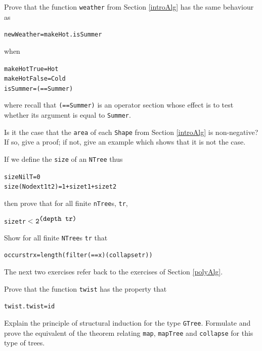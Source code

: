 \begin{exercises}

\item
Prove that the function \texttt{weather} from Section \ref{introAlg} has the same
behaviour as  
\begin{alltt}
newWeather = makeHot . isSummer
\end{alltt}
when
\begin{alltt}
makeHot True  = Hot
makeHot False = Cold
isSummer = (==Summer)
\end{alltt}
where recall that \texttt{(==Summer)} is an operator section whose effect is to
test whether its argument is equal to \texttt{Summer}.

\item
Is it the case that the \texttt{area} of each \texttt{Shape} from Section
\ref{introAlg} is non-negative? If so, give a proof; if not, give an example
which shows that it is not the case.

\item
If we define the \texttt{size} of an \texttt{NTree} thus
\begin{alltt}
size NilT           = 0
size (Node x t1 t2) = 1 + size t1 + size t2
\end{alltt}
then prove that for all finite \texttt{nTree}s, \texttt{tr},
\begin{alltt}
size tr \(<\) \(\mbox{\texttt{2}}^{\mbox{\texttt{(depth tr)}}}\)
\end{alltt}

\item
Show for all finite \texttt{NTree}s \texttt{tr} that
\begin{alltt}
occurs tr x = length (filter (==x) (collapse tr))
\end{alltt}

\medskip
\noindent
The next two exercises refer back to the exercises of Section \ref{polyAlg}.

\item
Prove that the function \texttt{twist} has the property that
\begin{alltt}
twist . twist = id
\end{alltt}

\item
Explain the principle of structural induction for the type \texttt{GTree}.
Formulate and prove the equivalent of the theorem relating \texttt{map}, 
\texttt{mapTree} and \texttt{collapse} for this type of trees.
\end{exercises}

